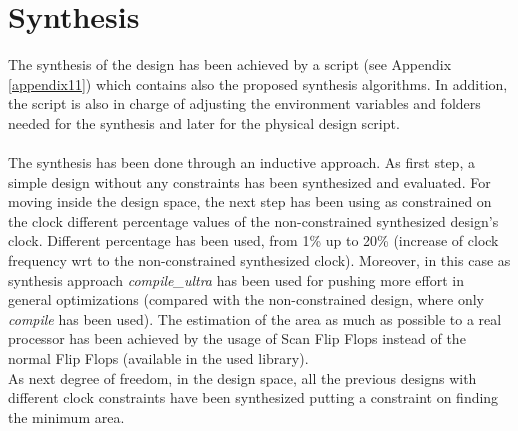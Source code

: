 \chapter{Synthesis}
\label{Synthesis}
The synthesis of the design has been achieved by a script (see Appendix \ref{appendix11}) which contains also the proposed synthesis algorithms. In addition, the script is also in charge of adjusting the environment variables and folders needed for the synthesis and later for the physical design script.\\\\
The synthesis has been done through an inductive approach. As first step, a simple design without any constraints has been synthesized and evaluated. For moving inside the design space, the next step has been using as constrained on the clock different percentage values of the non-constrained synthesized design's clock. Different percentage has been used, from 1\% up to 20\% (increase of clock frequency wrt to the non-constrained synthesized clock). Moreover, in this case as synthesis approach \textit{compile\_ultra} has been used for pushing more effort in general optimizations (compared with the non-constrained design, where only \textit{compile} has been used). The estimation of the area as much as possible to a real processor has been achieved by the usage of Scan Flip Flops instead of the normal Flip Flops (available in the used library).\\
As next degree of freedom, in the design space, all the previous designs with different clock constraints have been synthesized putting a constraint on finding the minimum area.

